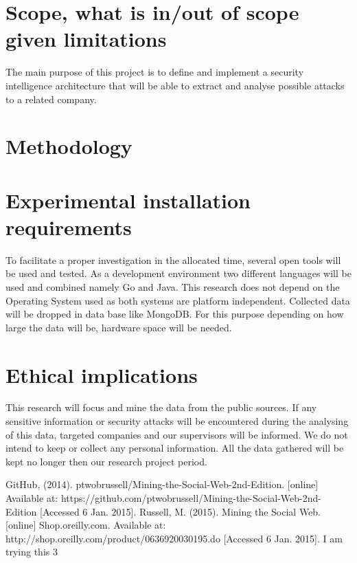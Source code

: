 \documentclass[12pt]{article}
\begin{document}
\section{Scope, what is in/out of scope given limitations}

The main purpose of this project is to define and implement a security intelligence architecture that will be able to extract and analyse possible attacks to a related company. 

 
\section{Methodology}


\section{Experimental installation requirements}

To facilitate a proper investigation in the allocated time, several open tools will be used and tested. As a development environment two different languages will be used and combined namely Go and Java. This research does not depend on the Operating System used as both systems are platform independent. Collected data will be dropped in data base like MongoDB. For this purpose depending on how large the data will be, hardware space will be needed.

\section{Ethical implications}

This research will focus and mine the data from the public sources. If any sensitive information or security attacks will be encountered during the analysing of this data, targeted companies and our supervisors will be informed. We do not intend to keep or collect any personal information. All the data gathered will be kept no longer then our research project period. 




\begin{thebibliography}{99}
  GitHub, (2014). ptwobrussell/Mining-the-Social-Web-2nd-Edition. [online] Available at: https://github.com/ptwobrussell/Mining-the-Social-Web-2nd-Edition [Accessed 6 Jan. 2015].
  Russell, M. (2015). Mining the Social Web. [online] Shop.oreilly.com. Available at: http://shop.oreilly.com/product/0636920030195.do [Accessed 6 Jan. 2015].
  I am trying this 3
\end{thebibliography}
\end{document}
